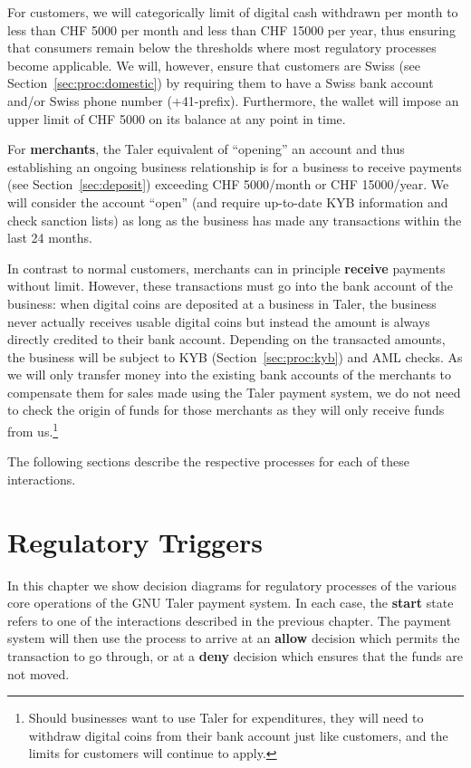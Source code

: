 \documentclass[10pt,a4paper,oneside]{book}
\begin{document}
For customers, we will categorically limit of digital cash withdrawn per month
to less than CHF 5000 per month and less than CHF 15000 per year, thus
ensuring that consumers remain below the thresholds where most regulatory
processes become applicable. We will, however, ensure that customers are Swiss
(see Section~\ref{sec:proc:domestic}) by requiring them to have a Swiss bank
account and/or Swiss phone number (+41-prefix).  Furthermore, the wallet will
impose an upper limit of CHF 5000 on its balance at any point in time.

For {\bf merchants}, the Taler equivalent of ``opening'' an account and thus
establishing an ongoing business relationship is for a business to receive
payments (see Section~\ref{sec:deposit}) exceeding CHF 5000/month or CHF
15000/year.  We will consider the account ``open'' (and require up-to-date KYB
information and check sanction lists) as long as the business has made any
transactions within the last 24 months.

In contrast to normal customers, merchants can in principle {\bf receive}
payments without limit. However, these transactions must go into the bank
account of the business: when digital coins are deposited at a business in
Taler, the business never actually receives usable digital coins but instead
the amount is always directly credited to their bank account.  Depending on
the transacted amounts, the business will be subject to KYB
(Section~\ref{sec:proc:kyb}) and AML checks. As we will only transfer money
into the existing bank accounts of the merchants to compensate them for sales
made using the Taler payment system, we do not need to check the origin of
funds for those merchants as they will only receive funds from
us.\footnote{Should businesses want to use Taler for expenditures, they will
need to withdraw digital coins from their bank account just like customers,
and the limits for customers will continue to apply.}

The following sections describe the respective processes for each of these
interactions.










\chapter{Regulatory Triggers} \label{chap:triggers}

In this chapter we show decision diagrams for regulatory processes of the
various core operations of the GNU Taler payment system.  In each case, the
{\bf start} state refers to one of the interactions described in the previous
chapter.  The payment system will then use the process to arrive at an {\bf
  allow} decision which permits the transaction to go through, or at a {\bf
  deny} decision which ensures that the funds are not moved.
\end{document}
